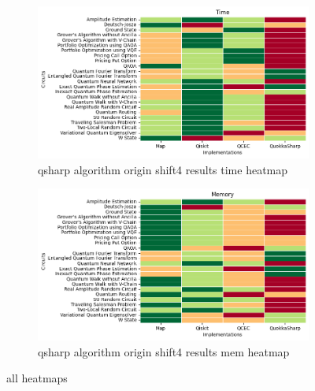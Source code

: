 
    \begin{figure}
    \centering
    \begin{subfigure}{.5\textwidth}
      \centering
      \includegraphics[width=1\linewidth]{benchmarks/./qsharp/all/algorithm/qsharp_algorithm_origin_shift4_results_time_heatmap.png}
      \caption{qsharp algorithm origin shift4 results time heatmap}
      \label{fig:gensets_qsharp_algorithm_origin_shift4_results_time_heatmap}
    \end{subfigure}
    \begin{subfigure}{.5\textwidth}
      \centering
      \includegraphics[width=1\linewidth]{benchmarks/./qsharp/all/algorithm/qsharp_algorithm_origin_shift4_results_mem_heatmap.png}
      \caption{qsharp algorithm origin shift4 results mem heatmap}
      \label{fig:gensets_qsharp_algorithm_origin_shift4_results_mem_heatmap}
    \end{subfigure}
    \caption{all heatmaps}
    \label{fig:gensets_qsharp_algorithm_origin_shift4_results_heatmaps}
    \end{figure}
    